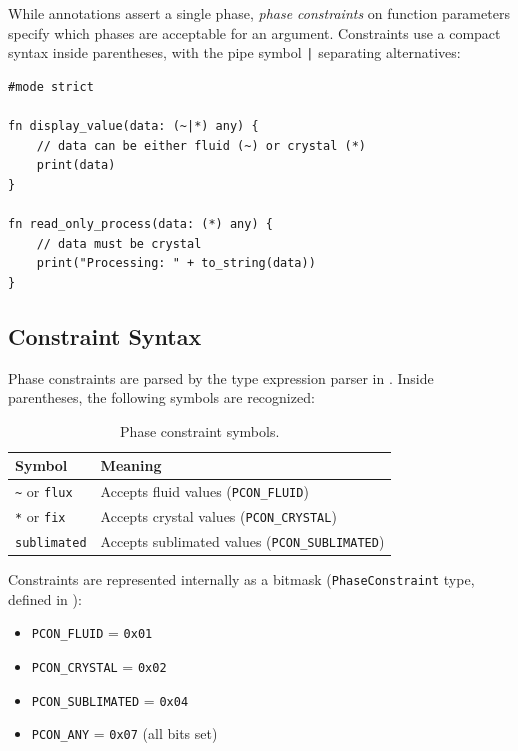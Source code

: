 
While annotations assert a single phase, \emph{phase constraints} on function parameters specify which phases are acceptable for an argument.
Constraints use a compact syntax inside parentheses, with the pipe symbol \lstinline{|} separating alternatives:

\begin{lstlisting}[language=Lattice, caption={Phase constraints on parameters}]
#mode strict

fn display_value(data: (~|*) any) {
    // data can be either fluid (~) or crystal (*)
    print(data)
}

fn read_only_process(data: (*) any) {
    // data must be crystal
    print("Processing: " + to_string(data))
}
\end{lstlisting}

\subsection{Constraint Syntax}

Phase constraints are parsed by the type expression parser in .
Inside parentheses, the following symbols are recognized:

\begin{table}[h]
\centering
\begin{tabular}{ll}
\toprule
\textbf{Symbol} & \textbf{Meaning} \\
\midrule
\lstinline|~| or \lstinline|flux| & Accepts fluid values (\lstinline|PCON_FLUID|) \\
\lstinline|*| or \lstinline|fix| & Accepts crystal values (\lstinline|PCON_CRYSTAL|) \\
\lstinline|sublimated| & Accepts sublimated values (\lstinline|PCON_SUBLIMATED|) \\
\bottomrule
\end{tabular}
\caption{Phase constraint symbols.}\label{tab:phase-constraint-symbols}
\end{table}

Constraints are represented internally as a bitmask (\lstinline|PhaseConstraint| type, defined in ):

\begin{itemize}
  \item \lstinline|PCON_FLUID| = \lstinline|0x01|
  \item \lstinline|PCON_CRYSTAL| = \lstinline|0x02|
  \item \lstinline|PCON_SUBLIMATED| = \lstinline|0x04|
  \item \lstinline|PCON_ANY| = \lstinline|0x07| (all bits set)
\end{itemize}

